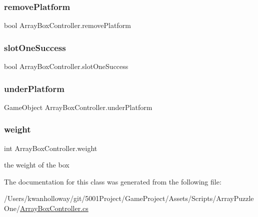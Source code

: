 \subsubsection{\texorpdfstring{remove\+Platform}{removePlatform}}
{\footnotesize\ttfamily bool Array\+Box\+Controller.\+remove\+Platform}

\mbox{\label{class_array_box_controller_a788b69c1dd5fd14ada59788891a50ec2}} 
\subsubsection{\texorpdfstring{slot\+One\+Success}{slotOneSuccess}}
{\footnotesize\ttfamily bool Array\+Box\+Controller.\+slot\+One\+Success}

\mbox{\label{class_array_box_controller_a7d14b3ed04e57ed25f856c76bc91bba3}} 
\subsubsection{\texorpdfstring{under\+Platform}{underPlatform}}
{\footnotesize\ttfamily Game\+Object Array\+Box\+Controller.\+under\+Platform}

\mbox{\label{class_array_box_controller_a0703f2b4690bc71070aa58210187a4f5}} 
\subsubsection{\texorpdfstring{weight}{weight}}
{\footnotesize\ttfamily int Array\+Box\+Controller.\+weight}



the weight of the box 



The documentation for this class was generated from the following file\+:\begin{DoxyCompactItemize}
\item 
/\+Users/kwanholloway/git/5001\+Project/\+Game\+Project/\+Assets/\+Scripts/\+Array\+Puzzle\+One/\hyperlink{_array_box_controller_8cs}{Array\+Box\+Controller.\+cs}\end{DoxyCompactItemize}
